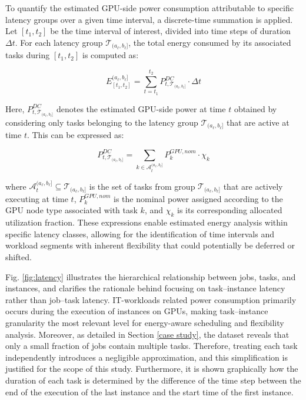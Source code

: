 \documentclass[preprint,12pt]{elsarticle}
\begin{document}
To quantify the estimated GPU-side power consumption attributable to specific latency groups over a given time interval, a discrete-time summation is applied. Let $[t_1, t_2]$ be the time interval of interest, divided into time steps of duration $\Delta t$. For each latency group $\mathcal{T}_{(a_\ell, b_\ell]}$, the total energy consumed by its associated tasks during $[t_1, t_2]$ is computed as:

\begin{equation}
E^{(a_\ell, b_\ell]}_{[t_1, t_2]} = \sum_{t = t_1}^{t_2} P^{DC}_{t, \mathcal{T}_{(a_\ell, b_\ell]}} \cdot \Delta t
\label{eq:energy_group}
\end{equation}

Here, $P^{DC}_{t, \mathcal{T}_{(a_\ell, b_\ell]}}$ denotes the estimated GPU-side power at time $t$ obtained by considering only tasks belonging to the latency group $\mathcal{T}_{(a_\ell, b_\ell]}$ that are active at time $t$. This can be expressed as:

\begin{equation}
P^{DC}_{t, \mathcal{T}_{(a_\ell, b_\ell]}} = \sum_{k \in \mathcal{A}_{t}^{(a_\ell, b_\ell]}} P^{GPU, nom}_k \cdot \chi_k
\label{eq:power_group}
\end{equation}

where $\mathcal{A}_{t}^{(a_\ell, b_\ell]} \subseteq \mathcal{T}_{(a_\ell, b_\ell]}$ is the set of tasks from group $\mathcal{T}_{(a_\ell, b_\ell]}$ that are actively executing at time $t$, $P^{GPU, nom}_k$ is the nominal power assigned according to the GPU node type associated with task $k$, and $\chi_k$ is its corresponding allocated utilization fraction. These expressions enable estimated energy analysis within specific latency classes, allowing for the identification of time intervals and workload segments with inherent flexibility that could potentially be deferred or shifted. 

Fig. \ref{fig:latency} illustrates the hierarchical relationship between jobs, tasks, and instances, and clarifies the rationale behind focusing on task–instance latency rather than job–task latency. IT-workloads related power consumption primarily occurs during the execution of instances on GPUs, making task–instance granularity the most relevant level for energy-aware scheduling and flexibility analysis. Moreover, as detailed in Section \ref{case study}, the dataset reveals that only a small fraction of jobs contain multiple tasks. Therefore, treating each task independently introduces a negligible approximation, and this simplification is justified for the scope of this study. Furthermore, it is shown graphically how the duration of each task is determined by the difference of the time step between the end of the execution of the last instance and the start time of the first instance. 
\end{document}
